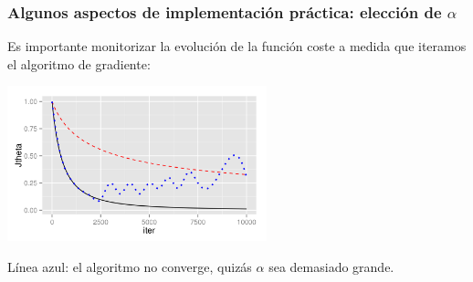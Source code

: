 \documentclass[aspectratio=169]{beamer}
\begin{document}
\begin{frame}
\frametitle{Algunos aspectos de implementación práctica: elección de $\alpha$}
\begin{overlayarea}{\textwidth}{8cm}
Es importante monitorizar la evolución de la función coste a medida que iteramos el algoritmo de gradiente:
\begin{center}
\includegraphics[height=4.5cm]{Jiter-3.png}
\end{center}
{\scriptsize Línea azul: el algoritmo no converge,  quizás $\alpha$ sea demasiado grande.}
\end{overlayarea}
\end{frame}
\end{document}
